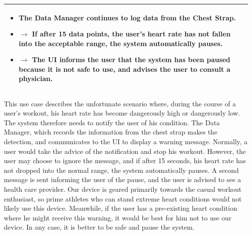 \documentclass[letterpaper,english, 12pt]{scrreprt}
\begin{document}
\begin{center}
\begin{longtable}{|C{15cm}|}
\begin{itemize}
                                        \item The Data Manager continues to log data from the Chest Strap.
										\item $\rightarrow$ If after 15 data points, the user's heart rate has not fallen into the acceptable range, the system automatically pauses.
										\item $\rightarrow$ The UI informs the user that the system has been paused because it is not safe to use, and advises the user to consult a physician.	
                                \end{itemize}
                                \\
                \hline
        \end{longtable}
\end{center}

This use case describes the unfortunate scenario where, during the course of a user's workout, his heart rate has become dangerously high or dangerously low. The system therefore needs to notify the user of his condition. The Data Manager, which records the information from the chest strap makes the detection, and communicates to the UI to display a warning message. Normally, a user would take the advice of the notification and stop his workout. However, the user may choose to ignore the message, and if after 15 seconds, his heart rate has not dropped into the normal range, the system automatically pauses. A second message is sent informing the user of the pause, and the user is advised to see a health care provider. Our device is geared primarily towards the casual workout enthusiast, so prime athletes who can stand extreme heart conditions would not likely use this device. Meanwhile, if the user has a pre-existing heart condition where he might receive this warning, it would be best for him not to use our device. In any case, it is better to be safe and pause the system.
\end{document}
